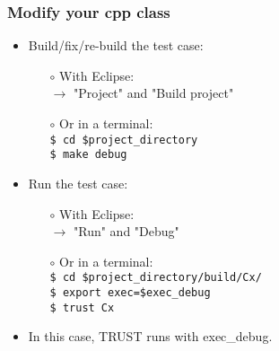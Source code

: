 \documentclass[10pt, hyperref={unicode=true,pdfusetitle, bookmarks=true,bookmarksnumbered=false,bookmarksopen=false, breaklinks=false,pdfborder={0 0 1},backref=true,colorlinks=true,linkcolor=darkblue,pageanchor, urlcolor=darkblue}]{beamer}
\begin{document}
\begin{frame}
\frametitle{Modify your cpp class}
\begin{block}{}

\begin{itemize}
\item Build/fix/re-build the test case:\\
    \begin{itemize}
    \item [$\circ$] With Eclipse:\\
    $\rightarrow$ "Project" and "Build project"\\
    \item [$\circ$] Or in a terminal:\\
    \texttt{\$ cd \$project\_directory}\\
    \texttt{\$ make debug}\\
    \end{itemize}

\item Run the test case:\\
    \begin{itemize}
    \item [$\circ$] With Eclipse:\\
    $\rightarrow$ "Run" and "Debug"\\
    \item [$\circ$] Or in a terminal:\\
    \texttt{\$ cd \$project\_directory/build/Cx/}\\
    \texttt{\$ export exec=\$exec\_debug}\\
    \texttt{\$ trust Cx}
    \end{itemize}

\item In this case, TRUST runs with exec\_debug.
\end{itemize}

\end{block}
\end{frame}
\end{document}
